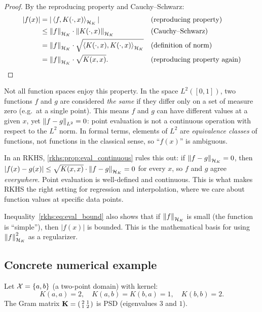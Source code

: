 \begin{notechapter}
\begin{proof}
By the reproducing property and Cauchy--Schwarz:
\begin{align*}
|f(x)|
&= |\left\langle f, K(\cdot,x) \right\rangle_{\mathcal{H}_K}|
  && \text{(reproducing property)} \\
&\leq \left\|f\right\|_{\mathcal{H}_K} \cdot
  \left\|K(\cdot,x)\right\|_{\mathcal{H}_K}
  && \text{(Cauchy--Schwarz)} \\
&= \left\|f\right\|_{\mathcal{H}_K} \cdot
  \sqrt{\left\langle K(\cdot,x), K(\cdot,x) \right\rangle_{\mathcal{H}_K}}
  && \text{(definition of norm)} \\
&= \left\|f\right\|_{\mathcal{H}_K} \cdot \sqrt{K(x,x)}.
  && \text{(reproducing property again)}
\end{align*}
\end{proof}

\begin{intuition}
Not all function spaces enjoy this property.
In the space $L^2([0,1])$, two functions $f$ and $g$
are considered \emph{the same} if they differ only on
a set of measure zero (e.g.\ at a single point). This
means $f$ and $g$ can have different values at a given
$x$, yet $\left\|f - g\right\|_{L^2} = 0$: point evaluation
is not a continuous operation with respect to the
$L^2$ norm. In formal terms, elements of $L^2$ are
\emph{equivalence classes} of functions, not functions
in the classical sense, so ``$f(x)$'' is ambiguous.

In an RKHS, \cref{rkhs:prop:eval_continuous}
rules this out: if $\left\|f - g\right\|_{\mathcal{H}_K} = 0$, then
$|f(x) - g(x)| \leq \sqrt{K(x,x)}
\cdot \left\|f - g\right\|_{\mathcal{H}_K} = 0$ for every $x$, so
$f$ and $g$ agree \emph{everywhere}. Point evaluation
is well-defined and continuous. This is what makes
RKHS the right setting for regression and
interpolation, where we care about function values
at specific data points.

Inequality~\eqref{rkhs:eq:eval_bound} also shows that if
$\left\|f\right\|_{\mathcal{H}_K}$ is small (the function is
``simple''), then $|f(x)|$ is bounded. This is the
mathematical basis for using $\left\|f\right\|_{\mathcal{H}_K}^2$ as a
regularizer.
\end{intuition}

\subsection{Concrete numerical example}

\begin{example}\label{rkhs:ex:two-point}
Let $\mathcal{X} = \{a, b\}$ (a two-point domain) with kernel:
\[
K(a,a) = 2, \quad K(a,b) = K(b,a) = 1, \quad K(b,b) = 2.
\]
The Gram matrix $\mathbf{K} = \begin{psmallmatrix} 2 & 1 \\ 1 & 2
\end{psmallmatrix}$ is PSD (eigenvalues $3$ and $1$).


\end{example}
\end{notechapter}
